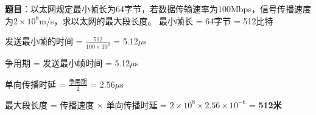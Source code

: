 \begin{examplebox}
\textbf{题目}：以太网规定最小帧长为64字节，若数据传输速率为100Mbps，信号传播速度为$2\times10^8$m/s，求以太网的最大段长度。
\tcblower
最小帧长 = 64字节 = 512比特

发送最小帧的时间 = $\frac{512}{100\times10^6}$ = 5.12$\mu$s

争用期 = 发送最小帧时间 = 5.12$\mu$s

单向传播时延 = $\frac{\text{争用期}}{2}$ = 2.56$\mu$s

最大段长度 = 传播速度 × 单向传播时延 = $2\times10^8 \times 2.56\times10^{-6}$ = \textbf{512米}
\end{examplebox}
